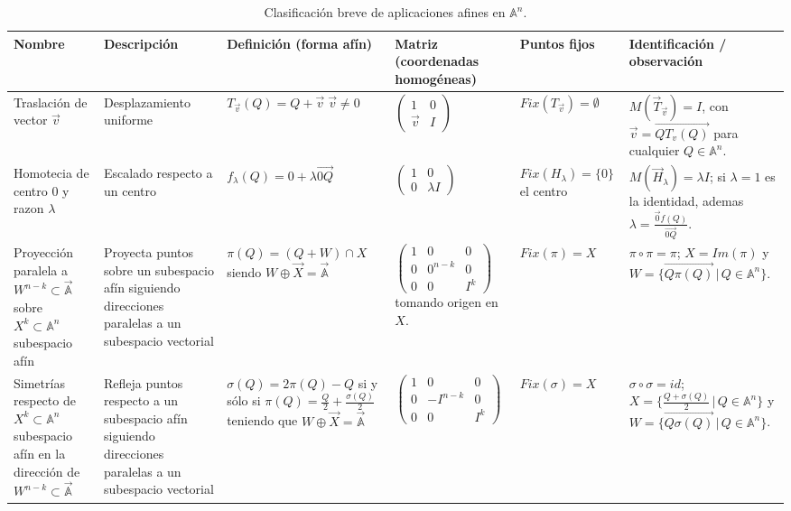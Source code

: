 \begin{table}[h]
\centering
\small
\begin{tabular}{|p{2.0cm}|p{2.4cm}|p{3.0cm}|p{3.0cm}|p{2.8cm}|p{2.8cm}|}
\hline
Nombre & Descripción & Definición (forma afín) & Matriz (coordenadas homogéneas) & Puntos fijos & Identificación / observación \\
\hline
Traslación de vector $\vec{v}$ & Desplazamiento uniforme & $T_{\vec{v}}(Q) = Q + \vec{v} \; \vec{v}\neq 0$ & $\displaystyle\begin{pmatrix} 1 & 0\\[2pt] \vec{v} & I\end{pmatrix}$ & $Fix(T_{\vec{v}}) = \emptyset$ & $M(\vec{T}_{\vec{v}}) = I$, con $\vec{v} = \vec{QT_v(Q)}$ para cualquier $Q \in \mathbb{A}^n$. \\
\hline
Homotecia de centro $0$ y razon $\lambda$ & Escalado respecto a un centro & $f_{\lambda}(Q) = 0 + \lambda \vec{0Q}$ & $\displaystyle\begin{pmatrix} 1 & 0\\[2pt] 0 & \lambda I\end{pmatrix}$ & $Fix(H_{\lambda}) = \{0\}$ el centro& $M(\vec{H}_{\lambda}) = \lambda I$; si $\lambda = 1$ es la identidad, ademas $\lambda = \frac{\vec{0}f(Q)}{\vec{0Q}}$. \\
\hline
Proyección paralela a $W^{n-k} \subset \vec{\mathbb{A}}$ sobre $X^k \subset \mathbb{A}^n$ subespacio afín & Proyecta puntos sobre un subespacio afín siguiendo direcciones paralelas a un subespacio vectorial & $\pi(Q) = (Q+W) \cap X$ siendo $W \oplus \vec{X} = \vec{\mathbb{A}}$ & $\displaystyle\begin{pmatrix} 1 & 0 & 0 \\ 0 & 0^{n-k} & 0 \\ 0 & 0 & I^k \end{pmatrix}$ tomando origen en $X$. & $Fix(\pi) = X$ & $\pi \circ \pi = \pi$; $X = Im(\pi)$ y $W = \{\overrightarrow{Q \pi(Q)} \, | \, Q \in \mathbb{A}^n\}$. \\
\hline
Simetrías respecto de $X^k \subset \mathbb{A}^n$ subespacio afín en la dirección de $W^{n-k} \subset \vec{\mathbb{A}}$ & Refleja puntos respecto a un subespacio afín siguiendo direcciones paralelas a un subespacio vectorial & $\sigma(Q) = 2 \pi(Q) - Q$ si y sólo si $\pi(Q) = \frac{Q}{2} + \frac{\sigma(Q)}{2}$ teniendo que $W \oplus \vec{X} = \vec{\mathbb{A}}$ & $\displaystyle\begin{pmatrix} 1 & 0 & 0 \\ 0 & -I^{n-k} & 0 \\ 0 & 0 & I^k \end{pmatrix}$ & $Fix(\sigma) = X$ & $\sigma \circ \sigma = id$; $X = \{ \frac{Q + \sigma(Q)}{2} \, | \, Q \in \mathbb{A}^n\}$ y $W = \{\overrightarrow{Q \sigma(Q)} \, | \, Q \in \mathbb{A}^n\}$. \\
\hline
\end{tabular}
\caption{Clasificación breve de aplicaciones afines en $\mathbb{A}^n$.}
\end{table}

